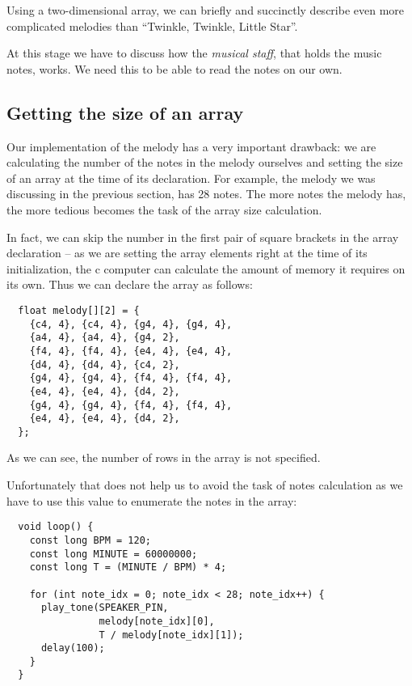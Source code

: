 \documentclass[../sparc.tex]{subfiles}
\begin{document}
Using a two-dimensional array, we can briefly and succinctly describe even more
complicated melodies than ``Twinkle, Twinkle, Little Star''.

At this stage we have to discuss how the \emph{musical staff}, that holds the
music notes, works.  We need this to be able to read the notes on our own.

\subsection{Getting the size of an array}

Our implementation of the melody has a very important drawback: we are
calculating the number of the notes in the melody ourselves and setting the size
of an array at the time of its declaration.  For example, the melody we was
discussing in the previous section, has 28 notes.  The more notes the melody
has, the more tedious becomes the task of the array size calculation.

In fact, we can skip the number in the first pair of square brackets in the
array declaration -- as we are setting the array elements right at the time of
its initialization, the c computer can calculate the amount of memory it
requires on its own.  Thus we can declare the array as follows:

\begin{verbatim}
  float melody[][2] = {
    {c4, 4}, {c4, 4}, {g4, 4}, {g4, 4},
    {a4, 4}, {a4, 4}, {g4, 2},
    {f4, 4}, {f4, 4}, {e4, 4}, {e4, 4},
    {d4, 4}, {d4, 4}, {c4, 2},
    {g4, 4}, {g4, 4}, {f4, 4}, {f4, 4},
    {e4, 4}, {e4, 4}, {d4, 2},
    {g4, 4}, {g4, 4}, {f4, 4}, {f4, 4},
    {e4, 4}, {e4, 4}, {d4, 2},
  };
\end{verbatim}

As we can see, the number of rows in the array is not specified.

Unfortunately that does not help us to avoid the task of notes calculation as we
have to use this value to enumerate the notes in the array:

\begin{verbatim}
  void loop() {
    const long BPM = 120;
    const long MINUTE = 60000000;
    const long T = (MINUTE / BPM) * 4;

    for (int note_idx = 0; note_idx < 28; note_idx++) {
      play_tone(SPEAKER_PIN,
                melody[note_idx][0],
                T / melody[note_idx][1]);
      delay(100);
    }
  }
\end{verbatim}
\end{document}
